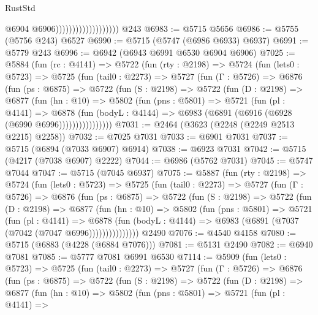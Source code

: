 \begin{lexlean}{RustStd}
\begin{coremodule}
                                          @6904
                                          @6906)))))))))))))))))))
    @243
@6983 := @5715 @5656
@6986 := @5755 (@5756 @243) @6527
@6990 := @5715 (@5747 (@6986 @6933) @6937)
@6991 := @5779 @243
@6996 := @6942 (@6943 @6991 @6530 @6904 @6906)
@7025 := @5884
    (fun (rc : @4141) =>
    @5722
      (fun (rty : @2198) =>
      @5724
        (fun (lets0 : @5723) =>
        @5725
          (fun (tail0 : @2273) =>
          @5727
            (fun (Γ : @5726) =>
            @6876
              (fun (ps : @6875) =>
              @5722
                (fun (S : @2198) =>
                @5722
                  (fun (D : @2198) =>
                  @6877
                    (fun (hn : @10) =>
                    @5802
                      (fun (pns : @5801) =>
                      @5721
                        (fun (pl : @4141) =>
                        @6878
                          (fun (bodyL : @4144) =>
                          @6983 (@6891 (@6916 (@6928 (@6990 @6996))))))))))))))))
@7031 := @2464 (@3623 (@2248 (@2249 @2513 @2215) @2258))
@7032 := @7025 @7031
@7033 := @6901 @7031
@7037 := @5715 (@6894 (@7033 @6907) @6914)
@7038 := @6923 @7031
@7042 := @5715 (@4217 (@7038 @6907) @2222)
@7044 := @6986 (@5762 @7031)
@7045 := @5747 @7044
@7047 := @5715 (@7045 @6937)
@7075 := @5887
    (fun (rty : @2198) =>
    @5724
      (fun (lets0 : @5723) =>
      @5725
        (fun (tail0 : @2273) =>
        @5727
          (fun (Γ : @5726) =>
          @6876
            (fun (ps : @6875) =>
            @5722
              (fun (S : @2198) =>
              @5722
                (fun (D : @2198) =>
                @6877
                  (fun (hn : @10) =>
                  @5802
                    (fun (pns : @5801) =>
                    @5721
                      (fun (pl : @4141) =>
                      @6878
                        (fun (bodyL : @4144) =>
                        @6983 (@6891 (@7037 (@7042 (@7047 @6996)))))))))))))))
    @2490
@7076 := @4540 @4158
@7080 := @5715 (@6883 (@4228 (@6884 @7076)))
@7081 := @5131 @2490
@7082 := @6940 @7081
@7085 := @5777 @7081 @6991 @6530
@7114 := @5909
    (fun (lets0 : @5723) =>
    @5725
      (fun (tail0 : @2273) =>
      @5727
        (fun (Γ : @5726) =>
        @6876
          (fun (ps : @6875) =>
          @5722
            (fun (S : @2198) =>
            @5722
              (fun (D : @2198) =>
              @6877
                (fun (hn : @10) =>
                @5802
                  (fun (pns : @5801) =>
                  @5721
                    (fun (pl : @4141) =>

\end{coremodule}
\end{lexlean}
